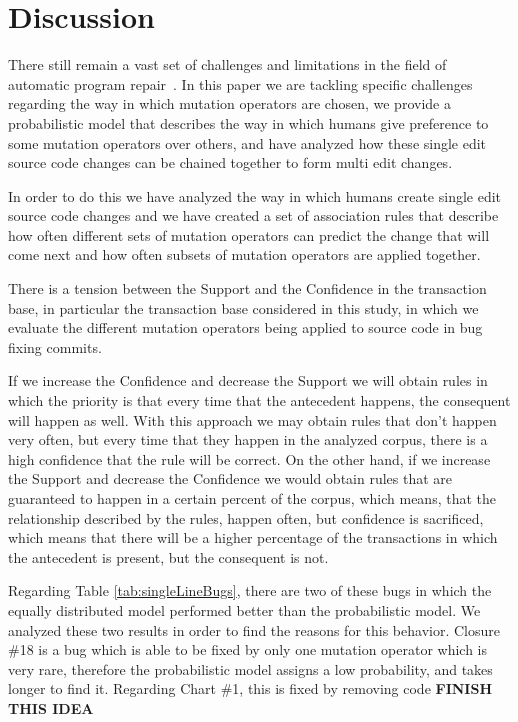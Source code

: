 \documentclass[conference]{IEEEtran}
\newcommand{\todo}[1]
  {{\scriptsize \textbf{\color{red} {#1}}}}
\begin{document}
\section{Discussion} \label{discussion}
There still remain a vast set of challenges and limitations in the field of 
automatic program repair~\cite{Qi15}. In this paper we are tackling specific 
challenges regarding the way in which mutation operators are chosen, we provide 
a probabilistic model that describes the way in which humans give preference to 
some mutation operators over others, and have analyzed how these single edit 
source code changes can be chained together to form multi edit changes.

In order to do this we have analyzed the way in which humans create single edit 
source code changes and we have created a set of association rules that describe 
how often different sets of mutation operators can predict the change that will 
come next and how often subsets of mutation operators are applied together.

There is a tension between the Support and the Confidence in the transaction 
base, in particular the transaction base considered in this study, in which we 
evaluate the different mutation operators being applied to source code in bug 
fixing commits. 

If we increase the Confidence and decrease the Support we will obtain rules in 
which the priority is that every time that the antecedent happens, the 
consequent will happen as well. With this approach we may obtain rules that 
don't happen very often, but every time that they happen in the analyzed corpus, 
there is a high confidence that the rule will be correct. On the other hand, if 
we increase the Support and decrease the Confidence we would obtain rules that 
are guaranteed to happen in a certain percent of the corpus, which means, that 
the relationship described by the rules, happen often, but confidence is 
sacrificed, which means that there will be a higher percentage of the 
transactions in which the antecedent is present, but the consequent is not. 

Regarding Table \ref{tab:singleLineBugs}, there are two of these bugs in which the equally distributed model performed better than the probabilistic model. We analyzed these two results in order to find the reasons for this behavior. Closure \#18 is a bug which is able to be fixed by only one mutation operator which is very rare, therefore the probabilistic model assigns a low probability, and takes longer to find it. Regarding Chart \#1, this is fixed by removing code \todo{FINISH THIS IDEA}
\end{document}
